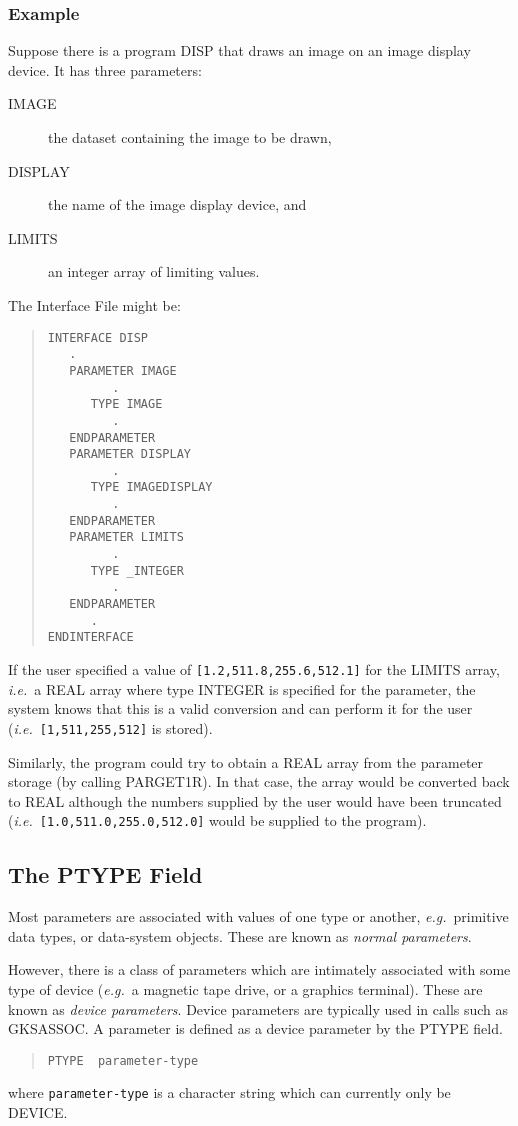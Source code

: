 \documentclass[twoside,11pt]{article}
\newcommand{\xlabel}[1]{}
\renewcommand{\_}{\texttt{\symbol{95}}}
\begin{document}
\subsubsection*{Example}
Suppose there is a program DISP that draws an image on an
image display device.
It has three parameters:
\begin{description}
\item[IMAGE] the dataset containing the image to be drawn,
\item[DISPLAY] the name of the image display device, and
\item[LIMITS] an integer array of limiting values.
\end{description}
The Interface File might be:
\begin{quote} \begin{verbatim}
INTERFACE DISP
   .
   PARAMETER IMAGE
         .
      TYPE IMAGE
         .
   ENDPARAMETER
   PARAMETER DISPLAY
         .
      TYPE IMAGEDISPLAY
         .
   ENDPARAMETER
   PARAMETER LIMITS
         .
      TYPE _INTEGER
         .
   ENDPARAMETER
      .
ENDINTERFACE
\end{verbatim} \end{quote}
If the user specified a value of \texttt{[1.2,511.8,255.6,512.1]}
for the LIMITS array, {\em i.e.}\ a \_REAL array where type \_INTEGER is
specified for the parameter, the system knows that this is a valid
conversion and can perform it for the user ({\em i.e.}\ \texttt{[1,511,255,512]}
is stored).

Similarly, the program could try to obtain a \_REAL array from the
parameter storage (by calling PAR\_GET1R)\@. In that case, the array would be
converted back to \_REAL although the numbers supplied by the user would have
been truncated ({\em i.e.}\ \texttt{[1.0,511.0,255.0,512.0]} would be supplied
to the program).

\subsection{The PTYPE Field\xlabel{the_ptype_field}}

Most parameters are associated with values of one type or another, {\em e.g.}\
primitive data types, or data-system objects. These are known as {\em normal
parameters}.

However, there is a class of parameters which are intimately associated with
some type of device ({\em e.g.}\ a magnetic tape drive, or a graphics terminal).
These are known as {\em device parameters}.
Device parameters are typically used in calls such as GKS\_ASSOC.
A parameter is defined as a device parameter by the PTYPE field.
\begin{quote} \begin{verbatim}
PTYPE  parameter-type
\end{verbatim} \end{quote}
where \texttt{parameter-type} is a character string which can currently only be
DEVICE.
\end{document}
